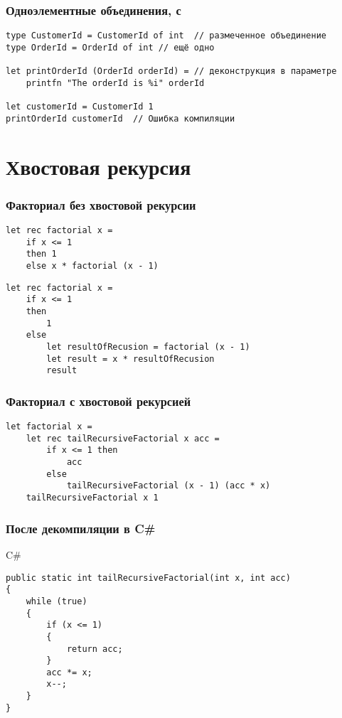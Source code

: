\documentclass[xetex,mathserif,serif]{beamer}
\begin{document}
    \begin{frame}[fragile]
        \frametitle{Одноэлементные объединения, с}
        \begin{verbatim}
type CustomerId = CustomerId of int  // размеченное объединение 
type OrderId = OrderId of int // ещё одно

let printOrderId (OrderId orderId) = // деконструкция в параметре
    printfn "The orderId is %i" orderId

let customerId = CustomerId 1
printOrderId customerId  // Ошибка компиляции
        \end{verbatim}
    \end{frame}

    \section{Хвостовая рекурсия}

    \begin{frame}[fragile]
        \frametitle{Факториал без хвостовой рекурсии}
        \begin{verbatim}
let rec factorial x =
    if x <= 1
    then 1 
    else x * factorial (x - 1)
        \end{verbatim}

        \begin{verbatim}
let rec factorial x =
    if x <= 1
    then
        1
    else
        let resultOfRecusion = factorial (x - 1)
        let result = x * resultOfRecusion
        result
        \end{verbatim}
    \end{frame}

    \begin{frame}[fragile]
        \frametitle{Факториал с хвостовой рекурсией}
        \begin{verbatim}
let factorial x =
    let rec tailRecursiveFactorial x acc =
        if x <= 1 then
            acc
        else
            tailRecursiveFactorial (x - 1) (acc * x)
    tailRecursiveFactorial x 1
        \end{verbatim}
    \end{frame}
    
    \begin{frame}[fragile]
        \frametitle{После декомпиляции в C\#}
        \begin{alertblock}{C\#}
            \begin{verbatim}
public static int tailRecursiveFactorial(int x, int acc)
{
    while (true)
    {
        if (x <= 1)
        {
            return acc;
        }
        acc *= x;
        x--;
    }
}
            \end{verbatim}
        \end{alertblock}
    \end{frame}
\end{document}
